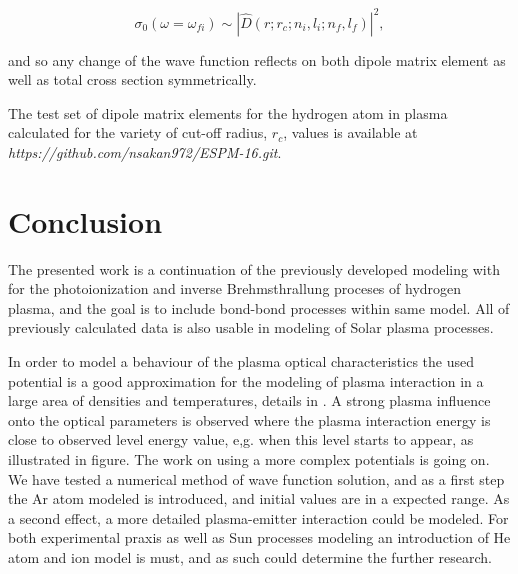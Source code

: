 \documentclass[a1]{sciposter}
\begin{document}
\begin{multicols}{3}
\begin{equation}
\label{eq::Presek_totalni_dipolni}
    \sigma _0 (\omega = \omega _{fi}) \sim
    \left| \hat{D}(r;r_{c};n_i,l_i;n_f,l_f) \right| ^2,
\end{equation}

{\noindent and so any change of the wave function reflects on both dipole matrix element as well as total cross section symmetrically.}


The test set of dipole matrix elements for the hydrogen atom in plasma calculated for the variety of cut-off radius, $r_{c}$, values is available at {\it https://github.com/nsakan972/ESPM-16.git}. 


\section{Conclusion}

The presented work is a continuation of the previously developed modeling with for the photoionization and inverse Brehmsthrallung proceses of hydrogen plasma, and the goal is to include bond-bond processes within same model. All of previously calculated data is also usable in modeling of Solar plasma processes. 

In order to model a behaviour of the plasma optical characteristics the used potential is a good approximation for the modeling of plasma interaction in a large area of densities and temperatures, details in  \cite{Sakan_atoms_2018}.  A strong plasma influence onto the optical parameters is observed where the plasma interaction energy is close to observed level energy value, e,g. when this level starts to appear, as illustrated in figure. The work on using a more complex potentials is going on. We have tested a numerical method of wave function solution, and as a first step the Ar atom  modeled is introduced, and initial values are in a expected range. As a second effect, a more detailed plasma-emitter interaction could be modeled. For both experimental praxis as well as Sun processes modeling an introduction of He atom and ion model is must, and as such could determine the further research.


\end{multicols}
\end{document}
